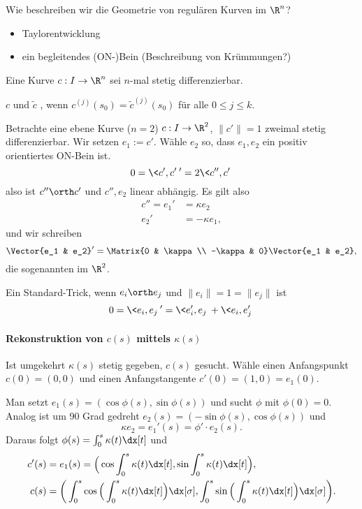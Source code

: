 Wie beschreiben wir die Geometrie von regulären Kurven im $\R^n$?
\begin{itemize}
	\item
		Taylorentwicklung
	\item
		ein begleitendes (ON-)Bein (Beschreibung von Krümmungen?)
\end{itemize}

Eine Kurve $c: I \to \R^n$ sei $n$-mal stetig differenzierbar.

\begin{df}
	$c$ und $\tilde c$ , wenn $c^{(j)}(s_0) = \tilde c^{(j)}(s_0)$ für alle $0 \le j \le k$.
\end{df}


Betrachte eine ebene Kurve ($n=2$) $c: I \to \R^2$, $\|c'\| = 1$ zweimal stetig differenzierbar.
Wir setzen $e_1 := c'$.
Wähle $e_2$ so, dass $e_1, e_2$ ein positiv orientiertes ON-Bein ist.
\[
	0
	= \<c', c'\>'
	= 2 \<c'', c'\>
\]
also ist $c'' \orth c'$ und $c'', e_2$ linear abhängig.
Es gilt also
\begin{align*}
	c'' = e_1' &= \kappa e_2 \\
	e_2' &= -\kappa e_1,
\end{align*}
und wir schreiben
\[
	\Vector{e_1 & e_2}'
	= \Matrix{0 & \kappa \\ -\kappa & 0}
	\Vector{e_1 & e_2},
\]
die sogenannten  im $\R^2$.

Ein Standard-Trick, wenn $e_i \orth e_j$ und $\|e_i\| = 1 = \|e_j\|$ ist
\[
	0 = \<e_i, e_j\>'
	= \<e_i', e_j\> + \<e_i, e_j'\>
\]

\paragraph{Rekonstruktion von $c(s)$ mittels $\kappa(s)$}

Ist umgekehrt $\kappa(s)$ stetig gegeben, $c(s)$ gesucht.
Wähle einen Anfangspunkt $c(0) = (0,0)$ und einen Anfangstangente $c'(0) = (1,0) = e_1(0)$.

Man setzt $e_1(s) = (\cos \phi(s), \sin \phi(s))$ und sucht $\phi$ mit $\phi(0) = 0$.
Analog ist um 90 Grad gedreht $e_2(s) = (-\sin \phi(s), \cos \phi(s))$ und
\[
	\kappa e_2
	= e_1' (s)
	= \phi'\cdot e_2 (s).
\]
Daraus folgt $\phi(s) = \int_0^s \kappa(t) \dx[t]$ und
\begin{align*}
	c'(s) &= e_1(s) = \Big( \cos \int_0^s \kappa(t) \dx[t], \sin \int_0^s \kappa(t) \dx[t] \Big), \\
	c(s) &= \bigg( \int_0^s \cos \Big( \int_0^s \kappa(t) \dx[t]\Big) \dx[\sigma], \int_0^s \sin \Big( \int_0^s \kappa(t) \dx[t] \Big) \dx[\sigma] \bigg).
\end{align*}

